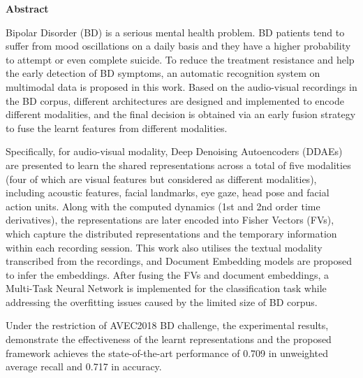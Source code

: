 \newpage
{\Huge \bf Abstract}
\vspace{24pt} 


Bipolar Disorder (BD) is a serious mental health problem. BD patients tend to suffer from mood oscillations on a daily basis and they have a higher probability to attempt or even complete suicide. To reduce the treatment resistance and help the early detection of BD symptoms, an automatic recognition system on multimodal data is proposed in this work. Based on the audio-visual recordings in the BD corpus, different architectures are designed and implemented to encode different modalities, and the final decision is obtained via an early fusion strategy to fuse the learnt features from different modalities. 

Specifically, for audio-visual modality, Deep Denoising Autoencoders (DDAEs) are presented to learn the shared representations across a total of five modalities (four of which are visual features but considered as different modalities), including acoustic features, facial landmarks, eye gaze, head pose and facial action units. Along with the computed dynamics (1st and 2nd order time derivatives), the representations are later encoded into Fisher Vectors (FVs), which capture the distributed representations and the temporary information within each recording session. This work also utilises the textual modality transcribed from the recordings, and Document Embedding models are proposed to infer the embeddings. After fusing the FVs and document embeddings, a Multi-Task Neural Network is implemented for the classification task while addressing the overfitting issues caused by the limited size of BD corpus. 

Under the restriction of AVEC2018 BD challenge, the experimental results, demonstrate the effectiveness of the learnt representations and the proposed framework achieves the state-of-the-art performance of 0.709 in unweighted average recall and 0.717 in accuracy.

\newpage
\vspace*{\fill}
